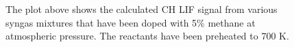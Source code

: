 \begin{figure}

\centering



\caption[Syngas-alkane-air flame results - II]{The plot above shows the calculated CH LIF signal from various syngas mixtures that have been doped with 5\% methane at atmospheric pressure. The reactants have been preheated to 700 K.}

\label{fig:syngas-700}

\end{figure}
